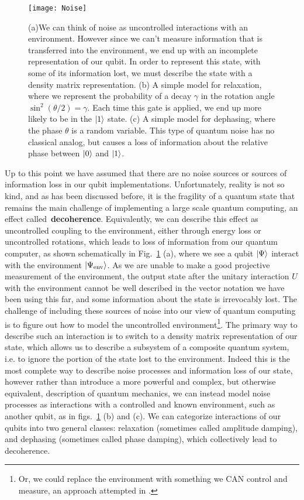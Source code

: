 \begin{figure}
  \texttt{[image: Noise]}
  \caption[Noise affecting pure states]
  {(a)We can think of noise as uncontrolled interactions with an environment. However since we can't measure
  information that is transferred into the environment, we end up with an incomplete representation of our qubit.
  In order to represent this state, with some of its information lost, we must describe the state with a density
  matrix representation. (b) A simple model for relaxation, where we represent the probability of a decay $\gamma$
  in the rotation angle $\sin^2(\theta/2) = \gamma$. Each time this gate is applied, we end up more likely to be in
  the $\ket{1}$ state. (c) A simple model for dephasing, where the phase $\theta$ is a random variable. This type
  of quantum noise has no classical analog, but causes a loss of information about the relative phase between $\ket{0}$
  and $\ket{1}$.}
  \label{fig:noise}
\end{figure}

Up to this point we have assumed that there are no noise sources or sources of information loss in our
qubit implementations. Unfortunately, reality is not so kind, and as has been discussed before, it is the
fragility of a quantum state that remains the main challenge of implementing a large scale quantum computing,
an effect called~\textbf{decoherence}. Equivalently, we can describe this effect as uncontrolled coupling to the environment, either through
energy loss or uncontrolled rotations, which leads to loss of information from our quantum computer, as shown schematically
in Fig.~\ref{fig:noise} (a), where we see a qubit $\ket{\Psi}$ interact with the environment $\ket{\Psi_{\textrm{env}}}$.
As we are unable to make a good projective measurement of the environment, the output
state after the unitary interaction $U$ with the environment cannot be well described in the vector notation we have been using
this far, and some information about the state is irrevocably lost. The challenge of including
these sources of noise into our view of quantum computing is to figure out how to model the uncontrolled
environment\footnote{Or, we could replace the environment with something we CAN control and measure, an approach attempted
in \cite{s41586-019-1287-z}.}.
The primary way to describe such an interaction is to switch to a density matrix representation of our state, which allows us
to describe a subsystem of a composite quantum system, i.e. to ignore the portion of the state lost to the environment.
Indeed this is the most complete way to describe noise processes and information loss of our state, however rather
than introduce a more powerful and complex, but otherwise equivalent, description of quantum mechanics, we can instead model
noise processes as interactions with a controlled and known environment, such as another qubit, as in figs.~\ref{fig:noise} (b) and (c).
We can categorize interactions of our qubits into two general classes: relaxation (sometimes called amplitude
damping), and dephasing (sometimes called phase damping), which collectively lead to decoherence.

